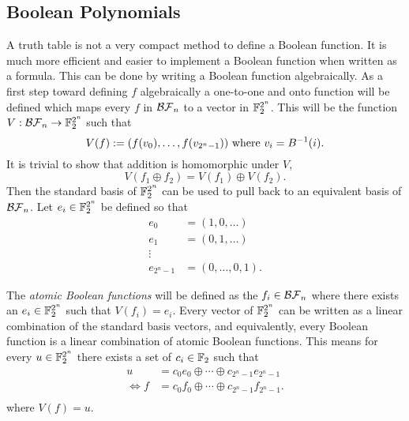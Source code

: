 \subsection{Boolean Polynomials}
\par A truth table is not a very compact method to define a Boolean
function. It is much more efficient and easier to implement a Boolean
function when written as a formula. This can be done by writing a Boolean
function algebraically. As a first step toward defining $f$ algebraically a
one-to-one and onto function will be defined which maps every $f$ in
$\mathcal{BF}_n$ to a vector in $\mathbb{F}_2^{2^n}$. This will be the function
$V:\mathcal{BF}_n\rightarrow\mathbb{F}_2^{2^n}$ such that
\begin{equation}\label{eqn:bool-vector}
  V(f)
    :=(f(v_0),\dots,f(v_{2^n-1}))\ {\rm where\ } v_i=B^{-1}(i).
\end{equation}
It is trivial to show that addition is homomorphic under $V$,
\[
V(f_1\oplus f_2)=V(f_1)\oplus V(f_2).
\]
Then the standard basis of $\mathbb{F}_2^{2^n}$ can be used to pull back to an
equivalent basis of $\mathcal{BF}_n$. Let $e_i\in\mathbb{F}_2^{2^n}$ be defined so that
\begin{align*}
  e_0&=(1,0,\dots)\\
  e_1&=(0,1,\dots)\\
  \vdots \\
  e_{2^n-1}&=(0,\dots,0,1).
\end{align*}
\par The {\em atomic Boolean functions} will be defined as the
$f_i\in\mathcal{BF}_n$ where there exists an $e_i\in\mathbb{F}_2^{2^n}$ such that
$V(f_i)=e_i$. Every vector of $\mathbb{F}_2^{2^n}$ can be written as a linear
combination of the standard basis vectors, and equivalently, every Boolean
function is a linear combination of atomic Boolean functions. This means
for every $u\in\mathbb{F}_2^{2^n}$ there exists a set of $c_i\in\mathbb{F}_2$ such that
\begin{align*}
  u  &=c_0e_0\oplus\cdots\oplus c_{2^n-1}e_{2^n-1} \\
  \Leftrightarrow f &=c_0f_0\oplus\cdots\oplus c_{2^n-1}f_{2^n-1}.\\
\end{align*}
where $V(f)=u$.

